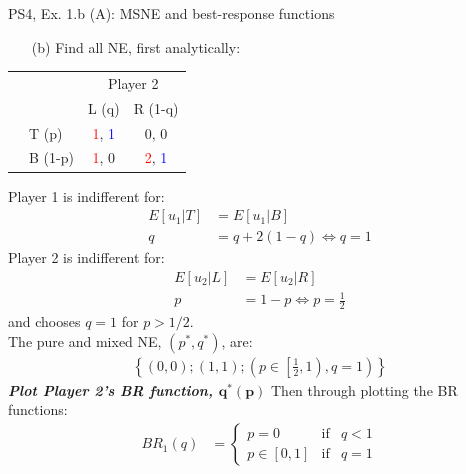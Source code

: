 \begin{frame}{PS4, Ex. 1.b (A): MSNE and best-response functions}
  \begin{multicols}{2}
    \begin{itemize}
      \item[(b)] Find all NE, first analytically:
    \end{itemize}
    \vspace{-8pt}
    \begin{table}
      \begin{tabular}{cl|c|c|}
        & \multicolumn{1}{c}{} & \multicolumn{2}{c}{\color{blue}Player 2}\\
        \parbox[t]{1mm}{}
        &  &  &  \\
        & T (p) & \textcolor{red}{1}, \textcolor{blue}{1} & 0, 0 \\
        & B (1-p) & \textcolor{red}{1}, 0 & \textcolor{red}{2}, \textcolor{blue}{1} \\
      \end{tabular}
    \end{table}
    Player 1 is indifferent for:
    \begin{align*}
      E[u_1|T]&=E[u_1|B]\\
      q &= q + 2(1-q) \Leftrightarrow q = 1
    \end{align*}
    Player 2 is indifferent for:
    \begin{align*}
      E[u_2|L]&=E[u_2|R]\\
      p &= 1-p \Leftrightarrow p = \frac{1}{2}
    \end{align*}
    and chooses $q=1$ for $p>1/2$.\\\medskip
    The pure and mixed NE, $(p^{*},q^{*})$, are:
    \begin{align*}
      \left\{(0,0);(1,1);\left(p\in\left[\frac{1}{2},1\right),q=1\right)\right\}
    \end{align*}
    \textbf{\textit{Plot Player 2's BR function, $\bm{q^{*}(p)}$}}
  \vfill\null \columnbreak
    Then through plotting the BR functions:
    \vspace{-8pt}
    \begin{align*}
      BR_1(q)&=\left\{ \begin{array}{lcl}
          p=0       & \text{if} & q<1 \\
          p\in[0,1] & \text{if} & q=1
      \end{array}\right. \\

\end{align*}
\end{multicols}
\end{frame}

